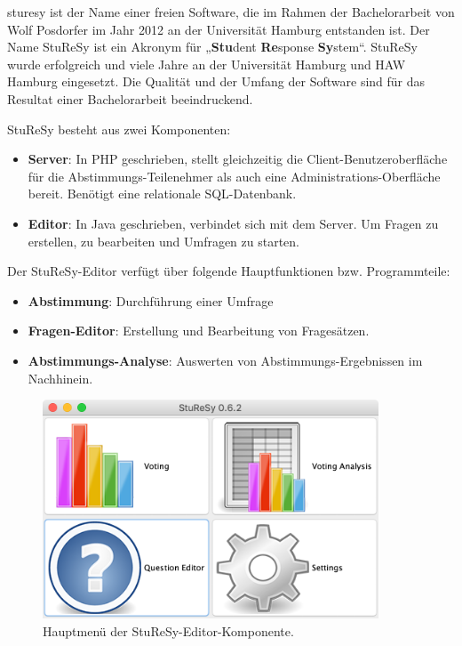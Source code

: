 \ac{sturesy} ist der Name einer freien Software, die im Rahmen der Bachelorarbeit von Wolf Posdorfer im Jahr 2012 an der Universität Hamburg entstanden ist\cite{sturesy}. Der Name StuReSy ist ein Akronym für „\textbf{Stu}dent \textbf{Re}sponse \textbf{Sy}stem“. StuReSy wurde erfolgreich und viele Jahre an der Universität Hamburg und HAW Hamburg eingesetzt. Die Qualität und der Umfang der Software sind für das Resultat einer Bachelorarbeit beeindruckend.

StuReSy besteht aus zwei Komponenten:
\begin{itemize}
    \item \textbf{Server}: In PHP geschrieben, stellt gleichzeitig die Client-Benutzeroberfläche für die Abstimmungs-Teilenehmer als auch eine Administrations-Oberfläche bereit. Benötigt eine relationale SQL-Datenbank.
    \item \textbf{Editor}: In Java geschrieben, verbindet sich mit dem Server. Um Fragen zu erstellen, zu bearbeiten und Umfragen zu starten.
\end{itemize}

Der StuReSy-Editor verfügt über folgende Hauptfunktionen bzw. Programmteile:
\begin{itemize}
    \item \textbf{Abstimmung}: Durchführung einer Umfrage
    \item \textbf{Fragen-Editor}: Erstellung und Bearbeitung von Fragesätzen.
    \item \textbf{Abstimmungs-Analyse}: Auswerten von Abstimmungs-Ergebnissen im Nachhinein.
\end{itemize}

\begin{figure}[H]
    \includegraphics[width=10cm]{chapter/bewertung/bilder/StuReSy_Hauptmenue.png}
    \centering
    \caption{Hauptmenü der StuReSy-Editor-Komponente.}
    \label{abb:sturesy_hauptmenue}
\end{figure}



